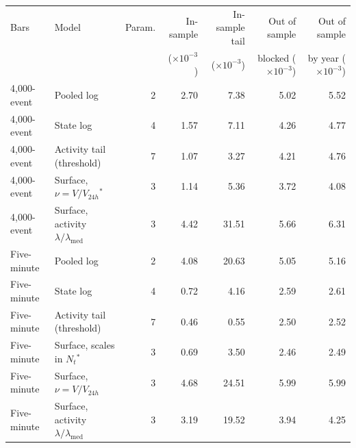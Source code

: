 \begin{tabular}{llrrrrr}
\toprule
Bars & Model & Param. & In-sample & In-sample tail & Out of sample & Out of sample \\
 &  &  & (\(\times 10^{-3}\)) & (\(\times 10^{-3}\)) & blocked (\(\times 10^{-3}\)) & by year (\(\times 10^{-3}\)) \\
\midrule
4,000-event & Pooled log & 2 & 2.70 & 7.38 & 5.02 & 5.52 \\
4,000-event & State log & 4 & 1.57 & 7.11 & 4.26 & 4.77 \\
4,000-event & Activity tail (threshold) & 7 & 1.07 & 3.27 & 4.21 & 4.76 \\
4,000-event & Surface, \(\nu=V/V_{24h}\)\(^\ast\) & 3 & 1.14 & 5.36 & 3.72 & 4.08 \\
4,000-event & Surface, activity \(\lambda/\lambda_{\mathrm{med}}\) & 3 & 4.42 & 31.51 & 5.66 & 6.31 \\
\addlinespace
Five-minute & Pooled log & 2 & 4.08 & 20.63 & 5.05 & 5.16 \\
Five-minute & State log & 4 & 0.72 & 4.16 & 2.59 & 2.61 \\
Five-minute & Activity tail (threshold) & 7 & 0.46 & 0.55 & 2.50 & 2.52 \\
Five-minute & Surface, scales in \(N_t\)\(^\ast\) & 3 & 0.69 & 3.50 & 2.46 & 2.49 \\
Five-minute & Surface, \(\nu=V/V_{24h}\) & 3 & 4.68 & 24.51 & 5.99 & 5.99 \\
Five-minute & Surface, activity \(\lambda/\lambda_{\mathrm{med}}\) & 3 & 3.19 & 19.52 & 3.94 & 4.25 \\
\bottomrule
\end{tabular}
